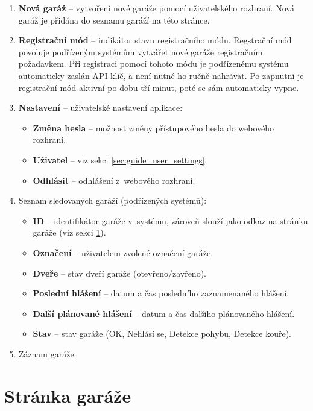 \begin{enumerate}
    \item \textbf{Nová garáž} -- vytvoření nové garáže pomocí uživatelského rozhraní. Nová garáž je přidána do seznamu garáží na této stránce.
    \item \textbf{Registrační mód} -- indikátor stavu registračního módu. Regstrační mód povoluje podřízeným systémům vytvářet nové garáže registračním požadavkem. Při registraci pomocí tohoto módu je podřízenému systému automaticky zaslán API klíč, a není nutné ho ručně nahrávat. Po zapnutní je registrační mód aktivní po dobu tří minut, poté se sám automaticky vypne.
    \item \textbf{Nastavení} -- uživatelské nastavení aplikace:
    \begin{itemize}
        \item \textbf{Změna hesla} -- možnost změny přístupového hesla do webového rozhraní.
        \item \textbf{Uživatel} -- viz sekci \ref{sec:guide_user_settings}.
        \item \textbf{Odhlásit} -- odhlášení z~webového rozhraní.
    \end{itemize}
    \item Seznam sledovaných garáží (podřízených systémů):
    \begin{itemize}
        \item \textbf{ID} -- identifikátor garáže v~systému, zároveň slouží jako odkaz na stránku garáže (viz sekci \ref{sec:guide_garage_page}).
        \item \textbf{Označení} -- uživatelem zvolené označení garáže.
        \item \textbf{Dveře} -- stav dveří garáže (otevřeno/zavřeno).
        \item \textbf{Poslední hlášení} -- datum a čas posledního zaznamenaného hlášení.
        \item \textbf{Další plánované hlášení} -- datum a čas dalšího plánovaného hlášení.
        \item \textbf{Stav} -- stav garáže (OK, Nehlásí se, Detekce pohybu, Detekce kouře).
    \end{itemize}
    \item Záznam garáže.
\end{enumerate}

\newpage

\section{Stránka garáže}
\label{sec:guide_garage_page}

